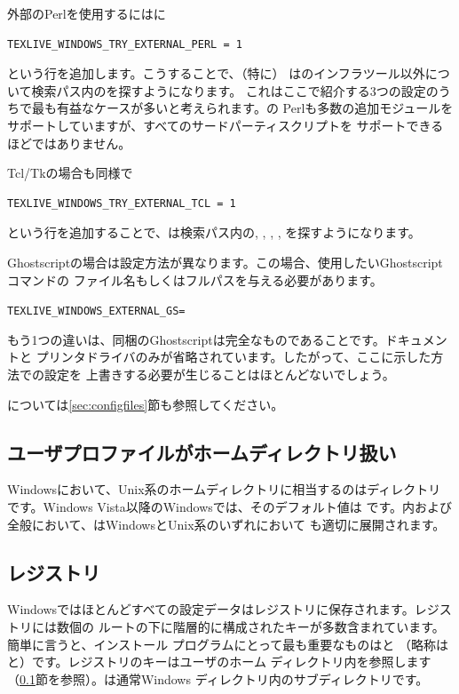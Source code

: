\documentclass[uplatex,dvipdfmx,12pt,tombow]{jsarticle}
\begin{document}
外部のPerlを使用するにはに
%
\begin{verbatim}
TEXLIVE_WINDOWS_TRY_EXTERNAL_PERL = 1
\end{verbatim}
%
という行を追加します。こうすることで、\TL （特に）
は\TL のインフラツール以外について検索パス内のを探すようになります。
これはここで紹介する3つの設定のうちで最も有益なケースが多いと考えられます。\TL の
Perlも多数の追加モジュールをサポートしていますが、すべてのサードパーティスクリプトを
サポートできるほどではありません。

Tcl/Tkの場合も同様で
%
\begin{verbatim}
TEXLIVE_WINDOWS_TRY_EXTERNAL_TCL = 1
\end{verbatim}
%
という行を追加することで、\TL は検索パス内の, ,
, , を探すようになります。

Ghostscriptの場合は設定方法が異なります。この場合、使用したいGhostscriptコマンドの
ファイル名もしくはフルパスを与える必要があります。
%
\begin{alltt}
TEXLIVE_WINDOWS_EXTERNAL_GS = 
\end{alltt}
%
もう1つの違いは、\TL 同梱のGhostscriptは完全なものであることです。ドキュメントと
プリンタドライバのみが省略されています。したがって、ここに示した方法で\TL の設定を
上書きする必要が生じることはほとんどないでしょう。

については\ref{sec:configfiles}節も参照してください。

\subsection{ユーザプロファイルがホームディレクトリ扱い}
\label{sec:winhome}

Windowsにおいて、Unix系のホームディレクトリに相当するのはディレクトリ
です。Windows Vista以降のWindowsでは、そのデフォルト値は%
です。内および\KPS 全般において、\dir{~}はWindowsとUnix系のいずれにおいて
も適切に展開されます。

\subsection{レジストリ}
\label{sec:registry}

Windowsではほとんどすべての設定データはレジストリに保存されます。レジストリには数個の
ルートの下に階層的に構成されたキーが多数含まれています。簡単に言うと、インストール
プログラムにとって最も重要なものはと%
（略称はと）です。レジストリのキーはユーザのホーム
ディレクトリ内を参照します（\ref{sec:winhome}節を参照）。は通常Windows%
ディレクトリ内のサブディレクトリです。
\end{document}
